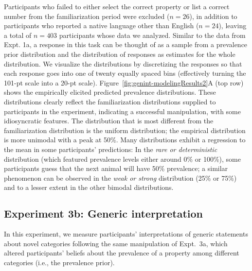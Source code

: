 \documentclass[floatsintext,man]{apa6}
\newcommand{\ndg}[1]{{\textcolor{Green}{[ndg: #1]}}}
\begin{document}
Participants who failed to either select the correct property or list a correct number from the familiarization period were excluded ($n=26$), in addition to participants who reported a native language other than English ($n=24$), leaving a total of $n=403$ participants whose data we analyzed.
Similar to the data from Expt. 1a, a response in this task can be thought of as a sample from a prevalence prior distribution and the distribution of responses as estimates for the whole distribution.
We visualize the distributions by discretizing the responses so that each response goes into one of twenty equally spaced bins (effectively turning the 101-pt scale into a 20-pt scale).
Figure~\ref{fig:genint-modelingResults2}A (top row) shows the empirically elicited predicted prevalence distributions.
These distributions clearly reflect the familiarization distributions supplied to participants in the experiment, indicating a successful manipulation, with some idiosyncratic features.
The distribution that is most different from the familiarization distribution is the uniform distribution; the empirical distribution is more unimodal with a peak at 50\%.
Many distributions exhibit a regression to the mean in some participants' predictions: In the \emph{rare or deterministic} distribution (which featured prevalence levels either around 0\% or 100\%), some participants guess that the next animal will have 50\% prevalence; a similar phenomenon can be observed in the \emph{weak or strong} distribution (25\% or 75\%) and to a lesser extent in the other bimodal distributions.



\hypertarget{experiment-2b-generic-interpretation}{%
\subsection{Experiment 3b: Generic interpretation}\label{experiment-2b-generic-interpretation}}
In this experiment, we measure participants' interpretations of generic statements about novel categories following the same manipulation of Expt.~3a, which altered participants' beliefs about the prevalence of a property among different categories (i.e., the prevalence prior). 
\end{document}
